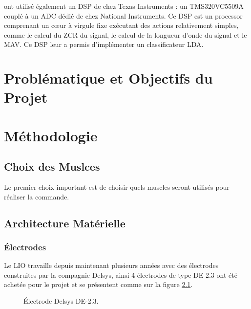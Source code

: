 \documentclass[letterpaper, twoside, 12pt, memoire, creativecommons, hyperref]{thETS}
\begin{document}
\cite{Tenore2007} ont utilisé également un DSP de chez Texas Instruments : un TMS320VC5509A couplé à un ADC dédié de chez National Instruments. Ce DSP est un processor comprenant un cœur à virgule fixe exécutant des actions relativement simples, comme le calcul du ZCR du signal, le calcul de la longueur d’onde du signal et le MAV. Ce DSP leur a permis d'implémenter un classificateur LDA.


\chapter{Problématique et Objectifs du Projet}

\chapter{Méthodologie}\label{CHmethodo}

\section{Choix des Muslces}

Le premier choix important est de choisir quels muscles seront utilisés pour réaliser la commande. 

\section{Architecture Matérielle}\label{CHarchimat}

\subsection{Électrodes}

Le LIO travaille depuis maintenant plusieurs années avec des électrodes construites par la compagnie Delsys, ainsi 4 électrodes de type DE-2.3 ont été achetée pour le projet et se présentent comme sur la figure \ref{fig:de2.3}. 

\begin{figure}
	\centering
	\caption{Électrode Delsys DE-2.3.}
	\label{fig:de2.3}
\end{figure}
\end{document}
